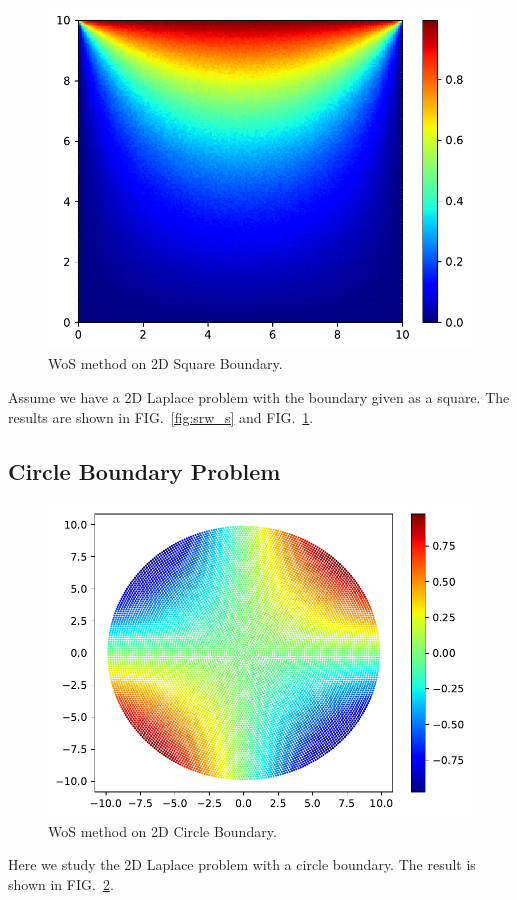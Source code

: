 \documentclass[aps, prl, preprint, groupedaddress]{revtex4-1}
\begin{document}
\begin{figure}[htbp]
    \centering
    \includegraphics[width=.8\textwidth]{./figs/wos_s}
    \caption{\label{fig:wos_s} WoS method on 2D Square Boundary.}
\end{figure}

Assume we have a 2D Laplace problem with the boundary given as a square. The results are shown in FIG.~\ref{fig:srw_s} and FIG.~\ref{fig:wos_s}.

\subsection{Circle Boundary Problem}

\begin{figure}[htbp]
    \centering
    \includegraphics[width=.8\textwidth]{./figs/wos_c}
    \caption{\label{fig:wos_c} WoS method on 2D Circle Boundary.}
\end{figure}

Here we study the 2D Laplace problem with a circle boundary. The result is shown in FIG.~\ref{fig:wos_c}.
\end{document}
